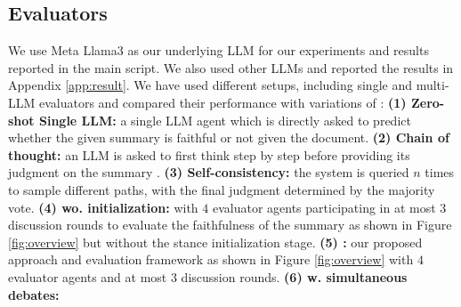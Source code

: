 \subsection{Evaluators}
We use Meta Llama3 \cite{llama3modelcard} as our underlying LLM for our experiments and results reported in the main script. We also used other LLMs and reported the results in Appendix \ref{app:result}.
We have used different setups, including single and multi-LLM evaluators and compared their performance with variations of \method:
%
\textbf{(1) Zero-shot Single LLM:} a single LLM agent which is directly asked to predict whether the given summary is faithful or not given the document. %
%
\textbf{(2) Chain of thought:} an LLM is asked to first think step by step before providing its judgment on the summary \cite{wei2022chain}.
%
\textbf{(3) Self-consistency:} the system is queried $n$ times \cite{wang2022self} to sample different paths, with the final judgment determined by the majority vote.
%
\textbf{(4) \method wo. initialization:} 
\method with $4$ evaluator agents participating in at most $3$ discussion rounds to evaluate the faithfulness of the summary as shown in Figure \ref{fig:overview} but without the stance initialization stage. 
%
\textbf{(5) \method:} our proposed approach and evaluation framework as shown in Figure \ref{fig:overview} with $4$ evaluator agents and at most $3$ discussion rounds.
%
\textbf{(6) \method w. simultaneous debates: }%
